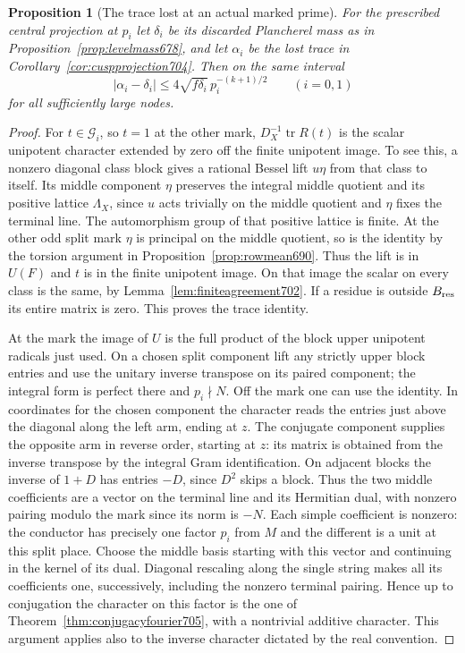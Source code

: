\documentclass[a4paper,11pt]{article}
\newtheorem{proposition}{Proposition}[section]
\theoremstyle{definition}
\theoremstyle{remark}
\numberwithin{equation}{section}
\begin{document}
\begin{proposition}[The trace lost at an actual marked prime]\leavevmode
\label{prop:marktrace705}
For the prescribed central projection at \(p_i\) let
\(\delta_i\) be its discarded Plancherel mass as in
Proposition~\ref{prop:levelmass678}, and let \(\alpha_i\) be
the lost trace in Corollary~\ref{cor:cuspprojection704}.
Then on the same interval
\[
       |\alpha_i-\delta_i|
           \le 4\sqrt{f\delta_i}\,p_i^{-(k+1)/2}
                         \qquad(i=0,1)
\]
for all sufficiently large nodes.
\end{proposition}
\begin{proof}
For \(t\in\mathcal G_i\), so \(t=1\) at the other mark,
\(D_X^{-1}\operatorname{tr}R(t)\) is the scalar unipotent
character extended by zero off the finite unipotent image.
To see this, a nonzero diagonal class block gives a rational
Bessel lift \(u\eta\) from that class to itself. Its middle
component \(\eta\) preserves the integral middle quotient
and its positive lattice \(\Lambda_X\), since \(u\) acts
trivially on the middle quotient and \(\eta\) fixes the
terminal line. The automorphism group of that positive
lattice is finite. At the other odd split mark \(\eta\)
is principal on the middle quotient, so is the identity by
the torsion argument in Proposition~\ref{prop:rowmean690}.
Thus the lift is in \(U(F)\) and \(t\) is in the finite
unipotent image. On that image the scalar on every class
is the same, by Lemma~\ref{lem:finiteagreement702}. If a
residue is outside \(B_{\rm res}\) its entire matrix is zero.
This proves the trace identity.

At the mark the image of \(U\) is the full product of the
block upper unipotent radicals just used. On a chosen
split component lift any strictly upper block entries and
use the unitary inverse transpose on its paired component;
the integral form is perfect there and \(p_i\nmid N\).
Off the mark one can use the identity. In coordinates for
the chosen component the character reads the entries just
above the diagonal along the left arm, ending at \(z\).
The conjugate component supplies the opposite arm in reverse
order, starting at \(z\): its matrix is obtained from the
inverse transpose by the integral Gram identification. On
adjacent blocks the inverse of \(1+D\) has entries \(-D\),
since \(D^2\) skips a block. Thus the two middle coefficients
are a vector on the terminal line and its Hermitian dual,
with nonzero pairing modulo the mark since its norm is
\(-N\). Each simple coefficient is nonzero: the conductor
has precisely one factor \(p_i\) from \(M\) and the different
is a unit at this split place. Choose the middle basis starting
with this vector and continuing in the kernel of its dual.
Diagonal rescaling along the single string makes all its
coefficients one, successively, including the nonzero terminal
pairing. Hence up to conjugation the character on this factor
is the one of Theorem~\ref{thm:conjugacyfourier705}, with a
nontrivial additive character. This argument applies also
to the inverse character dictated by the real convention.


\end{proof}
\end{document}
